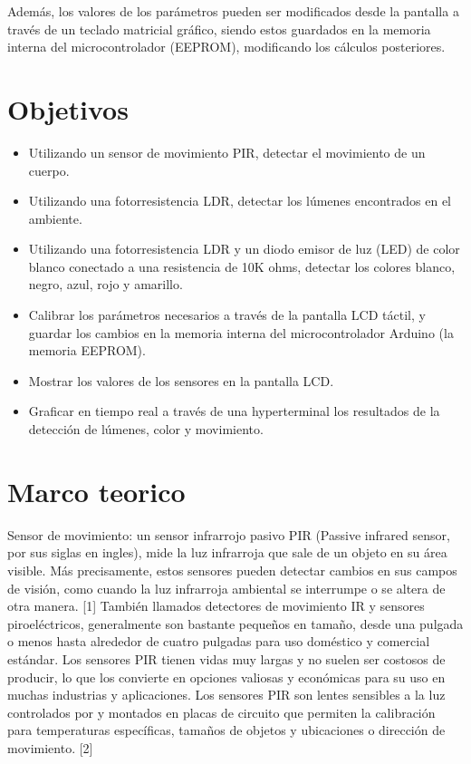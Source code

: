 \documentclass[conference]{IEEEtran}
\begin{document}
Además, los valores de los parámetros pueden ser modificados desde la pantalla a través de un teclado matricial gráfico, siendo estos guardados en la memoria interna del microcontrolador (EEPROM), modificando los cálculos posteriores.

\section{Objetivos}

\begin{itemize}
  \item Utilizando un sensor de movimiento PIR, detectar el movimiento de un cuerpo.
  \item Utilizando una fotorresistencia LDR, detectar los lúmenes encontrados en el ambiente.
  \item Utilizando una fotorresistencia LDR y un diodo emisor de luz (LED) de color blanco conectado a una resistencia de 10K ohms, detectar los colores blanco, negro, azul, rojo y amarillo.
  \item Calibrar los parámetros necesarios a través de la pantalla LCD táctil, y guardar los cambios en la memoria interna del microcontrolador Arduino (la memoria EEPROM).
  \item Mostrar los valores de los sensores en la pantalla LCD.
  \item Graficar en tiempo real a través de una hyperterminal los resultados de la detección de lúmenes, color y movimiento.
\end{itemize}

\section{Marco teorico}

Sensor de movimiento: un sensor infrarrojo pasivo PIR (Passive infrared sensor, por sus siglas en ingles), mide la luz infrarroja que sale de un objeto en su área visible. Más precisamente, estos sensores pueden detectar cambios en sus campos de visión, como cuando la luz infrarroja ambiental se interrumpe o se altera de otra manera. [1] También llamados detectores de movimiento IR y sensores piroeléctricos, generalmente son bastante pequeños en tamaño, desde una pulgada o menos hasta alrededor de cuatro pulgadas para uso doméstico y comercial estándar. Los sensores PIR tienen vidas muy largas y no suelen ser costosos de producir, lo que los convierte en opciones valiosas y económicas para su uso en muchas industrias y aplicaciones. Los sensores PIR son lentes sensibles a la luz controlados por y montados en placas de circuito que permiten la calibración para temperaturas específicas, tamaños de objetos y ubicaciones o dirección de movimiento. [2]
\end{document}
